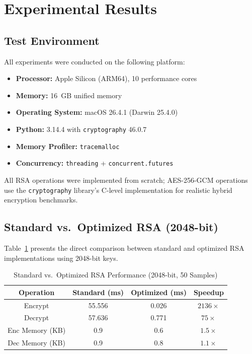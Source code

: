 \documentclass[journal]{IEEEtran}
\begin{document}
\section{Experimental Results}
\label{sec:results}

\subsection{Test Environment}

All experiments were conducted on the following platform:
\begin{itemize}
    \item \textbf{Processor:} Apple Silicon (ARM64), 10 performance cores
    \item \textbf{Memory:} 16~GB unified memory
    \item \textbf{Operating System:} macOS 26.4.1 (Darwin 25.4.0)
    \item \textbf{Python:} 3.14.4 with \texttt{cryptography} 46.0.7~\cite{cryptography_io}
    \item \textbf{Memory Profiler:} \texttt{tracemalloc}~\cite{python_tracemalloc}
    \item \textbf{Concurrency:} \texttt{threading} + \texttt{concurrent.futures}~\cite{python_threading}
\end{itemize}

All RSA operations were implemented from scratch; AES-256-GCM operations use the \texttt{cryptography} library's C-level implementation for realistic hybrid encryption benchmarks.

\subsection{Standard vs.\ Optimized RSA (2048-bit)}

Table~\ref{tab:std_vs_opt} presents the direct comparison between standard and optimized RSA implementations using 2048-bit keys.

\begin{table}[!t]
\caption{Standard vs.\ Optimized RSA Performance (2048-bit, 50 Samples)}
\label{tab:std_vs_opt}
\centering
\begin{tabular}{|c|c|c|c|}
\hline
\textbf{Operation} & \textbf{Standard (ms)} & \textbf{Optimized (ms)} & \textbf{Speedup} \\
\hline
Encrypt & 55.556 & 0.026 & $2136\times$ \\
\hline
Decrypt & 57.636 & 0.771 & $75\times$ \\
\hline
Enc Memory (KB) & 0.9 & 0.6 & $1.5\times$ \\
\hline
Dec Memory (KB) & 0.9 & 0.8 & $1.1\times$ \\
\hline
\end{tabular}
\end{table}
\end{document}

